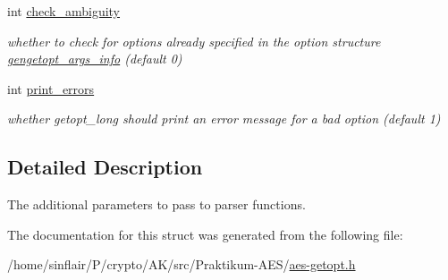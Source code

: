 \begin{DoxyCompactItemize}
\mbox{\label{structcmdline__parser__params_a6e4442704fc40b0b655f7cc602f13ec4}} 
int \hyperlink{structcmdline__parser__params_a6e4442704fc40b0b655f7cc602f13ec4}{check\+\_\+ambiguity}
\begin{DoxyCompactList}\small\item\em whether to check for options already specified in the option structure \hyperlink{structgengetopt__args__info}{gengetopt\+\_\+args\+\_\+info} (default 0) \end{DoxyCompactList}\item 
\mbox{\label{structcmdline__parser__params_a3236f066777488e8502abe05ccd24455}} 
int \hyperlink{structcmdline__parser__params_a3236f066777488e8502abe05ccd24455}{print\+\_\+errors}
\begin{DoxyCompactList}\small\item\em whether getopt\+\_\+long should print an error message for a bad option (default 1) \end{DoxyCompactList}\end{DoxyCompactItemize}


\subsection{Detailed Description}
The additional parameters to pass to parser functions. 

The documentation for this struct was generated from the following file\+:\begin{DoxyCompactItemize}
\item 
/home/sinflair/\+P/crypto/\+A\+K/src/\+Praktikum-\/\+A\+E\+S/\hyperlink{aes-getopt_8h}{aes-\/getopt.\+h}\end{DoxyCompactItemize}
